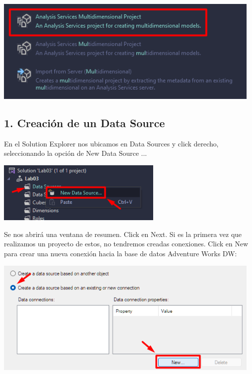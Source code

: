 \documentclass[12pt,letterpaper]{article}
\begin{document}
\begin{center}
    \includegraphics[width=13cm]{./img/img1.png}
\end{center}

\subsection{1. Creación de un Data Source}

En el Solution Explorer nos ubicamos en Data Sources y click derecho, seleccionando la opción de New
Data Source ...

\begin{center}
    \includegraphics[width=8cm]{./img/img2.png}
\end{center}

Se nos abrirá una ventana de resumen. Click en Next. Si es la primera vez que realizamos un proyecto de estos, no tendremos creadas conexiones. Click en New para crear una nueva conexión hacia la base de datos Adventure Works DW:

\begin{center}
    \includegraphics[width=13cm]{./img/img3.png}
\end{center}
\end{document}
